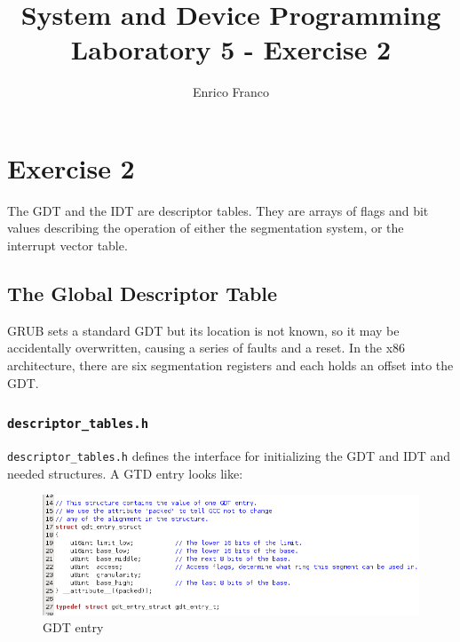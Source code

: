 \documentclass{report}
\author{Enrico Franco}
\title{System and Device Programming \\
	Laboratory 5 - Exercise 2}
\begin{document}
\section*{Exercise 2}
The GDT and the IDT are descriptor tables. They are arrays of flags and bit values describing the operation of either the segmentation system, or the interrupt vector table.

\subsection*{The Global Descriptor Table}
GRUB sets a standard GDT but its location is not known, so it may be accidentally overwritten, causing a series of faults and a reset. In the x86 architecture, there are six segmentation registers and each holds an offset into the GDT.

\subsubsection*{\texttt{descriptor\_tables.h}}
\texttt{descriptor\_tables.h} defines the interface for initializing the GDT and IDT and needed structures.
A GTD entry looks like:

\begin{figure}[hbtp]
\centering
\includegraphics[scale=0.4]{images/es02/gdt_entry.png}
\caption{GDT entry}
\end{figure}
\end{document}
